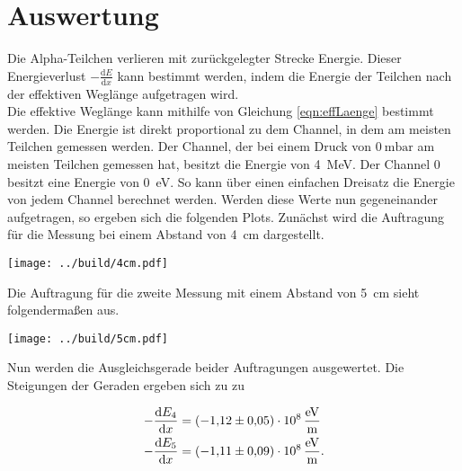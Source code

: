 


\section{Auswertung}
\label{sec:Auswertung}

Die Alpha-Teilchen verlieren mit zurückgelegter Strecke Energie. Dieser Energieverlust $-\frac{\text{d} E}{\text{d} x}$ 
kann bestimmt werden, indem die Energie der Teilchen nach der effektiven Weglänge aufgetragen wird. \\
Die effektive Weglänge kann mithilfe von Gleichung \eqref{eqn:effLaenge} bestimmt werden.
\noindent Die Energie ist direkt proportional zu dem Channel, in dem am meisten Teilchen gemessen werden. Der Channel, der bei einem Druck von 
$\qty{0}{\milli \bar}$ am meisten Teilchen gemessen hat, besitzt die Energie von \qty{4}{\mega \eV}. Der Channel \num{0} 
besitzt eine Energie von \qty{0}{\eV}. So kann über einen einfachen Dreisatz die Energie von jedem Channel berechnet 
werden. Werden diese Werte nun gegeneinander aufgetragen, so ergeben sich die folgenden Plots.
Zunächst wird die Auftragung für die Messung bei einem Abstand von \qty{4}{\centi \meter} dargestellt.

\begin{figure*}[h]
    \texttt{[image: ../build/4cm.pdf]}
    \caption{Effektive Weglänge gegen am meist gemessene Energie bei 4 cm Abstand.}
\end{figure*}

\noindent Die Auftragung für die zweite Messung mit einem Abstand von \qty{5}{\centi \meter} sieht folgendermaßen aus.

\begin{figure*}[h] %
    \texttt{[image: ../build/5cm.pdf]}
    \caption{Effektive Weglänge gegen am meist gemessene Energie bei 5 cm Abstand.}
\end{figure*}

\noindent Nun werden die Ausgleichsgerade beider Auftragungen ausgewertet. Die Steigungen der Geraden ergeben sich zu zu 

\begin{align*}
    -\frac{\text{d} E_4}{\text{d} x} &= \qty{-1.12 \pm 0.05 e8}{\eV \per \meter} \\
    -\frac{\text{d} E_5}{\text{d} x} &= \qty{-1.11 \pm 0.09 e8}{\eV \per \meter}. \\
\end{align*}

